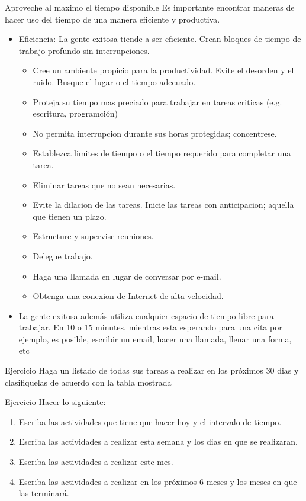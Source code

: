 \documentclass[
10pt,
aspectratio=169,
]{beamer}
\begin{document}
\begin{frame}[c]{Aproveche al maximo el tiempo disponible}
Es importante encontrar maneras de hacer uso del tiempo de una manera \alert{eficiente} y \alert{productiva}.
\begin{itemize}
\item \alert{Eficiencia}: La gente exitosa tiende a ser eficiente. Crean bloques de tiempo de trabajo profundo sin interrupciones.
\begin{itemize}
\item Cree un ambiente propicio para la productividad. Evite el desorden y el ruido. Busque el lugar o el tiempo adecuado.
\item Proteja su tiempo mas preciado para trabajar en tareas criticas (e.g. escritura, programci\'on)
\item No permita interrupcion durante sus horas protegidas; concentrese. 
\item Establezca limites de tiempo o el tiempo requerido para completar una tarea.
\item Eliminar tareas que no sean necesarias.
\item Evite la dilacion de las tareas. Inicie las tareas con anticipacion; aquella que tienen un plazo.
\item Estructure y supervise reuniones.
\item Delegue trabajo.
\item Haga una llamada en lugar de conversar por e-mail.
\item Obtenga una conexion de Internet de alta velocidad. 
\end{itemize}
\item La gente exitosa adem\'as utiliza cualquier espacio de tiempo libre para trabajar. En 10 o 15 minutes, mientras esta esperando para una cita por ejemplo, es posible, escribir un email, hacer una llamada, llenar una forma, etc
\end{itemize}
\end{frame}

\begin{frame}[c]{Ejercicio}
Haga un listado de todas sus tareas a realizar en los  pr\'oximos 30 dias y clasifiquelas de acuerdo con la tabla mostrada
\end{frame}

\begin{frame}[c]{Ejercicio}
Hacer lo siguiente:
\begin{enumerate}
\item Escriba las actividades  que tiene que hacer hoy y el intervalo de tiempo.
\item Escriba las actividades a realizar esta semana y los dias en que se realizaran.
\item Escriba las actividades a realizar este mes.
\item Escriba las actividades a realizar en los pr\'oximos 6 meses y los meses en que las terminar\'a. 
\end{enumerate}
\end{frame}
\end{document}
